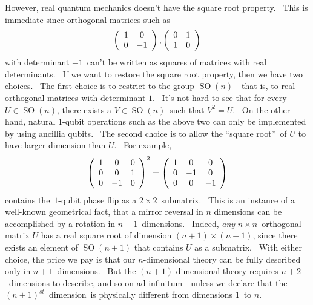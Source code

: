 \documentclass{article}%
\begin{document}
However, real quantum mechanics doesn't have the square root property. \ This
is immediate since orthogonal matrices such as%
\[
\left(
\begin{array}
[c]{cc}%
1 & 0\\
0 & -1
\end{array}
\right)  ,\left(
\begin{array}
[c]{cc}%
0 & 1\\
1 & 0
\end{array}
\right)
\]
with determinant $-1$\ can't be written as squares of matrices with real
determinants. \ If we want to restore the square root property, then we have
two choices. \ The first choice is to restrict to the group
$\operatorname*{SO}\left(  n\right)  $---that is, to real orthogonal matrices
with determinant $1$. \ It's not hard to see that for every $U\in
\operatorname*{SO}\left(  n\right)  $, there exists a $V\in\operatorname*{SO}%
\left(  n\right)  $\ such that $V^{2}=U$. \ On the other hand, natural
$1$-qubit operations such as the above two can only be implemented by using
ancillia qubits. \ The second choice is to allow the \textquotedblleft square
root\textquotedblright\ of $U$ to have larger dimension than $U$. \ For
example, \
\[
\left(
\begin{array}
[c]{ccc}%
1 & 0 & 0\\
0 & 0 & 1\\
0 & -1 & 0
\end{array}
\right)  ^{2}=\left(
\begin{array}
[c]{ccc}%
1 & 0 & 0\\
0 & -1 & 0\\
0 & 0 & -1
\end{array}
\right)
\]
contains the\ $1$-qubit phase flip as a $2\times2$\ submatrix. \ This is an
instance of a well-known geometrical fact, that a mirror reversal in $n$
dimensions can be accomplished by a rotation in $n+1$\ dimensions. \ Indeed,
\textit{any} $n\times n$\ orthogonal matrix $U$ has a real square root of
dimension $\left(  n+1\right)  \times\left(  n+1\right)  $, since there exists
an element of $\operatorname*{SO}\left(  n+1\right)  $ that contains $U$ as a
submatrix. \ With either choice, the price we pay is that our $n$-dimensional
theory can be fully described only in $n+1$\ dimensions. \ But the $\left(
n+1\right)  $-dimensional theory requires $n+2$\ dimensions to describe, and
so on ad infinitum---unless we declare that the $\left(  n+1\right)  ^{st}%
$\ dimension\ is physically different from dimensions $1$\ to $n$.
\end{document}
